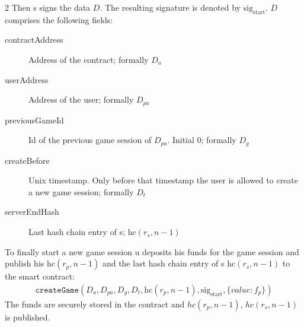 \documentclass[oneside]{amsart}
\begin{document}
\begin{multicols}{2}
Then \Gls{s} signs the data $D$. The resulting signature is denoted by $\text{sig}_{\text{start}}$.
$D$ comprises the following fields:
\begin{description}
    \item[contractAddress] Address of the contract; formally $D_a$
    \item[userAddress] Address of the user; formally $D_{pa}$
    \item[previousGameId] Id of the previous game session of $D_{pa}$. Initial 0; formally $D_g$
    \item[createBefore] Unix timestamp. Only before that timestamp the user is allowed to create a new game session; formally $D_t$
    \item[serverEndHash] Last hash chain entry of \gls{s}; $\text{hc}(r_s, n - 1)$
\end{description}

To finally start a new game session \gls{u} deposits his funds for the game session and publish his $\text{hc}(r_p, n - 1)$
and the last hash chain entry of \gls{s} $\text{hc}(r_s, n - 1)$ to the smart contract:
\begin{align}
    \texttt{createGame}(D_a, D_{pa}, D_g, D_t, \text{hc}(r_p, n - 1), \text{sig}_{\text{start}}, \lbrace value: f_p \rbrace)
\end{align}
The funds are securely stored in the contract and $hc(r_p, n - 1)$, $hc(r_s, n - 1)$  is published.


\end{multicols}
\end{document}
